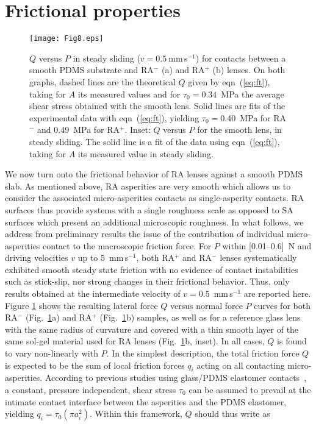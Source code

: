 \documentclass[pre,groupedaddress,showkeys,showpacs,twocolumn]{revtex4}
\begin{document}
\section*{Frictional properties}
%
\begin{figure}
	\texttt{[image: Fig8.eps]}
	\caption{$Q$ versus $P$ in steady sliding ($v=0.5~$mm\,s$^{-1}$) for contacts between a smooth PDMS substrate and RA$^-$ (a) and RA$^+$ (b) lenses. On both graphs, dashed lines are the theoretical $Q$ given by eqn~(\ref{eq:ft}), taking for $A$ its measured values and for $\tau_0=0.34$~MPa the average shear stress obtained with the smooth lens. Solid lines are fits of the experimental data with eqn~(\ref{eq:ft}), yielding $\tau_0=$0.40~MPa for RA$^-$ and 0.49~MPa for RA$^+$. Inset: $Q$ versus $P$ for the smooth lens, in steady sliding. The solid line is a fit of the data using eqn~(\ref{eq:ft}), taking for $A$ its measured value in steady sliding.}
	\label{fig:friction} 
\end{figure}
%
We now turn onto the frictional behavior of RA lenses against a smooth PDMS slab. As mentioned above, RA asperities are very smooth which allows us to consider the associated micro-asperities contacts as single-asperity contacts. RA surfaces thus provide systems with a single roughness scale as opposed to SA surfaces which present an additional microscopic roughness. In what follows, we address from preliminary results the issue of the contribution of individual micro-asperities contact to the macroscopic friction force. For $P$ within [0.01--0.6]~N and driving velocities $v$ up to 5~mm\,s$^{-1}$, both RA$^+$ and RA$^-$ lenses systematically exhibited smooth steady state friction with no evidence of contact instabilities such as stick-slip, nor strong changes in their frictional behavior. Thus, only results obtained at the intermediate velocity of $v=0.5$~mm\,s$^{-1}$ are reported here. Figure \ref{fig:friction} shows the resulting lateral force $Q$ versus normal force $P$ curves for both RA$^{-}$ (Fig.~\ref{fig:friction}a) and RA$^{+}$ (Fig.~\ref{fig:friction}b) samples, as well as for a reference glass lens with the same radius of curvature and covered with a thin smooth layer of the same sol-gel material used for RA lenses (Fig.~\ref{fig:friction}b, inset). In all cases, $Q$ is found to vary non-linearly with $P$. In the simplest description, the total friction force $Q$ is expected to be the sum of local friction forces $q_i$ acting on all contacting micro-asperities. According to previous studies using glass/PDMS elastomer contacts~\cite{nguyen2011,chateauminois2008}, a constant, pressure independent, shear stress $\tau_0$ can be assumed to  prevail at the intimate contact interface between the asperities and the PDMS elastomer, yielding $q_i=\tau_0 (\pi a_i^2)$. Within this framework, $Q$ should thus write as
\end{document}
